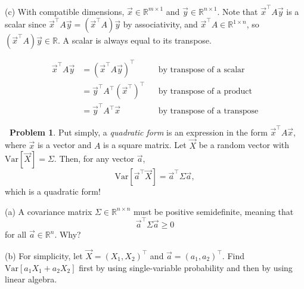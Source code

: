 \documentclass[12pt,oneside]{article}
\newcommand{\Var}{\text{Var}}
\newcommand{\R}{\mathbb{R}}
\theoremstyle{definition}
\newtheorem{problem}{\faPen \ Problem}
\theoremstyle{remark}
\begin{document}
\begin{solutionbox}
(c) With compatible dimensions, $\vec{x} \in \R^{m \times 1}$ and $\vec{y} \in \R^{n \times 1}$. Note that $\vec{x}^{\top} A \vec{y}$ is a scalar since $\vec{x}^{\top} A \vec{y} = (\vec{x}^{\top} A) \vec{y}$ by associativity, and $\vec{x}^{\top} A \in \R^{1 \times n}$, so $(\vec{x}^{\top} A) \vec{y} \in \R$. A scalar is always equal to its transpose.

\[
\begin{aligned}
\vec{x}^{\top} A \vec{y} &= (\vec{x}^{\top} A \vec{y})^{\top} && \text{by transpose of a scalar} \\
&= \vec{y}^{\top} A^{\top} (\vec{x} ^{\top})^{\top} && \text{by transpose of a product} \\
&= \vec{y}^{\top} A^{\top} \vec{x} && \text{by transpose of a transpose}
\end{aligned}
\]
\end{solutionbox}

\begin{problem}
Put simply, a \textit{quadratic form} is an expression in the form $\vec{x}^{\top} A \vec{x}$, where $\vec{x}$ is a vector and $A$ is a square matrix. Let $\vec{X}$ be a random vector with $\Var[\vec{X}] = \Sigma$. Then, for any vector $\vec{a}$, \[\Var[\vec{a}^{\top} \vec{X}] = \vec{a}^{\top} \Sigma \vec{a},\] which is a quadratic form!

(a) A covariance matrix $\Sigma \in \R^{n \times n}$ must be positive semidefinite, meaning that \[\vec{a}^{\top} \Sigma \vec{a} \geq 0\] for all $\vec{a} \in \R^{n}$. Why?

(b) For simplicity, let $\vec{X} = (X_1, X_2)^{\top}$ and $\vec{a} = (a_1, a_2)^{\top}$. Find $\Var[a_1 X_1 + a_2 X_2]$ first by using single-variable probability and then by using linear algebra.
\end{problem}
\end{document}
